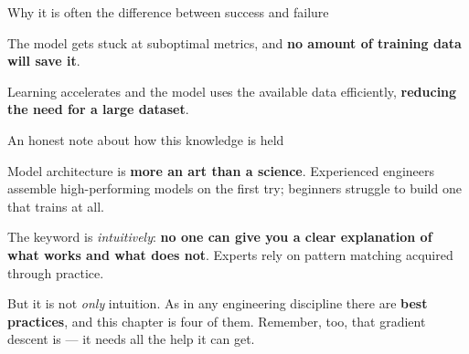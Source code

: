 \documentclass[aspectratio=169,11pt,t]{beamer}
\begin{document}
\begin{frame}[shrink=25]{Why it is often the difference between success and failure}
\begin{minipage}[t]{0.494\textwidth}
\begin{icardbad}
The model gets stuck at suboptimal metrics, and \textbf{no amount of training data will save it}.
\end{icardbad}
\end{minipage}%
\hfill
\begin{minipage}[t]{0.494\textwidth}
\begin{icardgood}
Learning accelerates and the model uses the available data efficiently, \textbf{reducing the need for a large dataset}.
\end{icardgood}
\end{minipage}%
\begin{iquote}
\end{iquote}
\end{frame}

\begin{frame}[shrink=25]{An honest note about how this knowledge is held}
{\fontsize{9.4}{12.6}\selectfont\color{fg2}Model architecture is \textbf{more an art than a science}. Experienced engineers assemble high-performing models on the first try; beginners struggle to build one that trains at all.\par}\vskip 4pt
\begin{iband}[amber]
The keyword is \textit{intuitively}: \textbf{no one can give you a clear explanation of what works and what does not}. Experts rely on pattern matching acquired through practice.
\end{iband}
{\fontsize{9.4}{12.6}\selectfont\color{fg2}But it is not \textit{only} intuition. As in any engineering discipline there are \textbf{best practices}, and this chapter is four of them. Remember, too, that gradient descent is  --- it needs all the help it can get.\par}\vskip 4pt
\end{frame}

\end{document}
